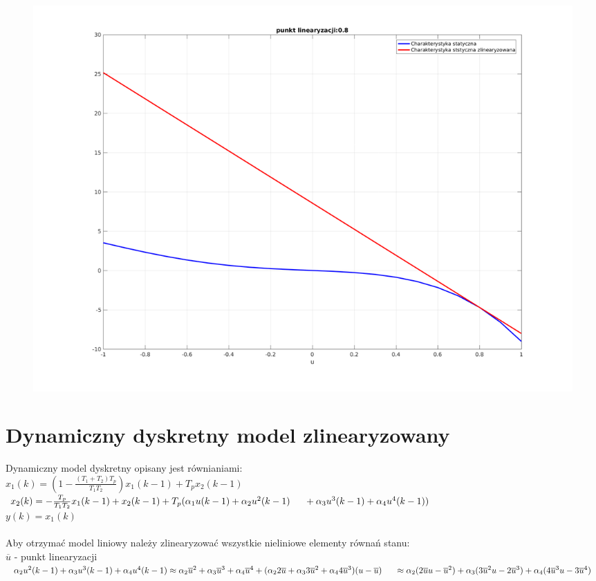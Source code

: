 \documentclass[a4paper, 11pt]{article}
\begin{document}
\begin{figure}[H]
\centering
\includegraphics[scale=0.45]{6_0,8.png}
\end{figure}

\section{Dynamiczny dyskretny model zlinearyzowany}
Dynamiczny model dyskretny opisany jest równianiami:
\\

$x_1(k) =(1-\frac{(T_1 + T_2)T_p}{T_1T_2})x_1(k-1)+T_px_2(k-1) $
\\

$x_2(k) = - \frac{T_p}{T_1T_2}x_1(k-1) + x_2(k-1) + T_p(\alpha_1u(k-1)+\alpha_2u^2(k-1)\\
	\indent	+ \alpha_3u^3(k-1)+\alpha_4u^4(k-1))$
\\

$y(k) = x_1(k)$
\\
\\

\noindent Aby otrzymać model liniowy należy zlinearyzować wszystkie nieliniowe elementy równań stanu:
\\

$\overline{u}$ - punkt linearyzacji 
\\

$\alpha_2u^2(k-1)+ \alpha_3u^3(k-1)+\alpha_4u^4(k-1) \approx \alpha_2\overline{u}^2 + \alpha_3\overline{u}^3 + \alpha_4\overline{u}^4 + (\alpha_22\overline{u} + \alpha_33\overline{u}^2 + \alpha_44\overline{u}^3)(u-\overline{u})  \\ \indent \approx \alpha_2(2\overline{u}u - \overline{u}^2)+ \alpha_3(3\overline{u}^2u-2\overline{u}^3) + \alpha_4(4\overline{u}^3u - 3\overline{u}^4)$
\\
\end{document}
